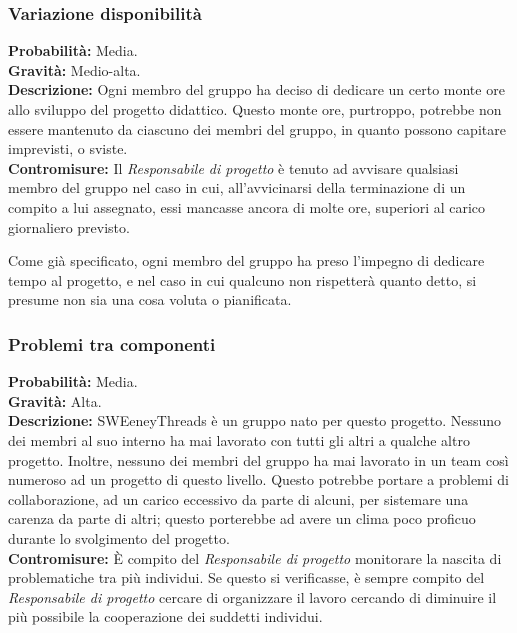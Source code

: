 \documentclass[a4paper]{article}
\begin{document}
			\subsubsection{Variazione disponibilità}
			\label{VariazioneDisponibilita}
				\textbf{Probabilità:} Media.
				\\ 
				\textbf{Gravità:} Medio-alta.
				\\ 
				\textbf{Descrizione:} Ogni membro del gruppo ha deciso di dedicare un certo monte ore allo sviluppo del 
					progetto didattico. Questo monte ore, purtroppo, potrebbe non essere mantenuto da 
					ciascuno dei membri del gruppo, in quanto possono capitare imprevisti, o sviste.
				\\ 
				\textbf{Contromisure:} Il \emph{Responsabile di progetto} è tenuto ad avvisare qualsiasi membro del gruppo 
					nel caso in cui, all'avvicinarsi della terminazione di un compito a lui assegnato, 
					essi mancasse ancora di molte ore, superiori al carico giornaliero previsto. 
					
					Come già specificato, ogni membro del gruppo ha preso l'impegno di dedicare tempo 
					al progetto, e nel caso in cui qualcuno non rispetterà quanto detto, si presume 
					non sia una cosa voluta o pianificata.
			\subsubsection{Problemi tra componenti}
				\textbf{Probabilità:} Media.
				\\ 
				\textbf{Gravità:} Alta.
				\\ 
				\textbf{Descrizione:} SWEeneyThreads è un gruppo nato per questo progetto. Nessuno dei membri al suo interno 
					ha mai lavorato con tutti gli altri a qualche altro progetto. Inoltre, nessuno dei membri 
					del gruppo ha mai lavorato in un team così numeroso ad un progetto di questo livello. 
					Questo potrebbe portare a problemi di collaborazione, ad un carico eccessivo da parte di 
					alcuni, per sistemare una carenza da parte di altri; questo porterebbe ad avere un clima 
					poco proficuo durante lo svolgimento del progetto.
				\\ 
				\textbf{Contromisure:} È compito del \emph{Responsabile di progetto} monitorare la nascita di problematiche tra più 
					individui. Se questo si verificasse, è sempre compito del \emph{Responsabile di progetto} 
					cercare di organizzare il lavoro cercando di diminuire il più possibile la cooperazione 
					dei suddetti individui. 
					
\end{document}

